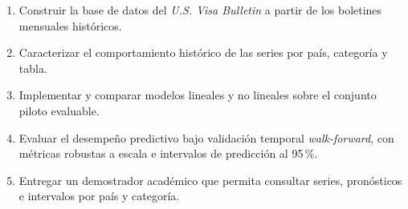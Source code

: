 \documentclass[12pt,letterpaper]{report}
\begin{document}
\begin{enumerate}[label=\arabic*., leftmargin=1.2cm, itemsep=4pt]

    \item Construir la base de datos del \textit{U.S. Visa Bulletin} a partir de los boletines mensuales históricos.

    \item Caracterizar el comportamiento histórico de las series por país, categoría y tabla.

    \item Implementar y comparar modelos lineales y no lineales sobre el conjunto piloto evaluable.

    \item Evaluar el desempeño predictivo bajo validación temporal \textit{walk-forward}, con métricas robustas a escala e intervalos de predicción al 95\,\%.

    \item Entregar un demostrador académico que permita consultar series, pronósticos e intervalos por país y categoría.

\end{enumerate}
\end{document}
